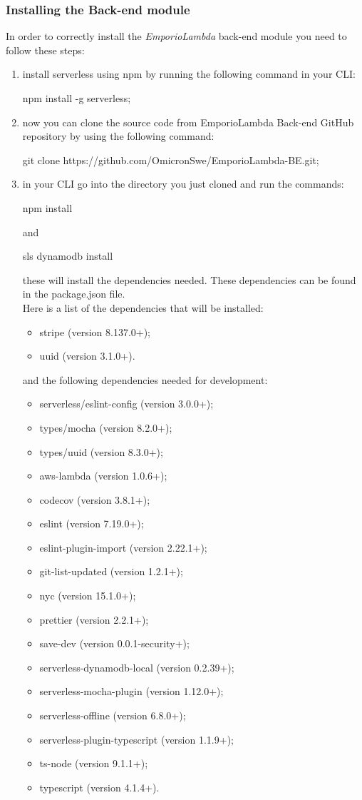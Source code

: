 \subsubsection{Installing the Back-end module}
In order to correctly install the \textit{EmporioLambda} back-end module you need to follow these steps:
\begin{enumerate}
\item install serverless using npm by running the following command in your CLI:\begin{center}
npm install -g serverless;
\end{center}
\item now you can clone the source code from EmporioLambda Back-end GitHub repository by using the following command:
\begin{center}
git clone https://github.com/OmicronSwe/EmporioLambda-BE.git;
\end{center}
\item in your CLI go into the directory you just cloned and run the commands:
\begin{center}
npm install
\end{center}
and
\begin{center}
sls dynamodb install
\end{center}
these will install the dependencies needed. These dependencies can be found in the package.json file.\\Here is a list of the dependencies that will be installed:
\begin{itemize}
\item stripe (version 8.137.0+);
\item uuid (version 3.1.0+).
\end{itemize}
and the following dependencies needed for development:
\begin{itemize}
\item serverless/eslint-config (version 3.0.0+);
\item types/mocha (version 8.2.0+);
\item types/uuid (version 8.3.0+);
\item aws-lambda (version 1.0.6+);
\item codecov (version 3.8.1+);
\item eslint (version 7.19.0+);
\item eslint-plugin-import (version 2.22.1+);
\item git-list-updated (version 1.2.1+);
\item nyc (version 15.1.0+);
\item prettier (version 2.2.1+);
\item save-dev (version 0.0.1-security+);
\item serverless-dynamodb-local (version 0.2.39+);
\item serverless-mocha-plugin (version 1.12.0+);
\item serverless-offline (version 6.8.0+);
\item serverless-plugin-typescript (version 1.1.9+);
\item ts-node (version 9.1.1+);
\item typescript (version 4.1.4+).
\end{itemize}
\end{enumerate}